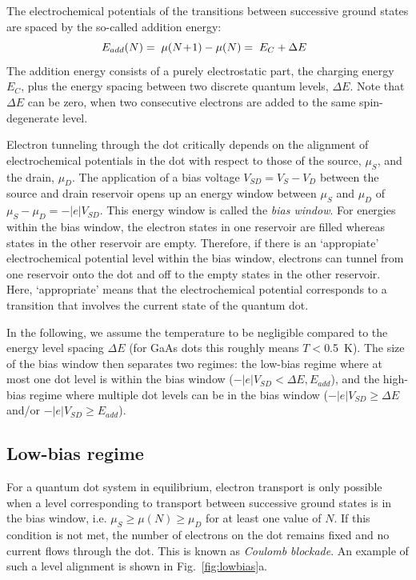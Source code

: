 \documentclass[rmp,twocolumn,aps]{revtex4}
\begin{document}
The electrochemical potentials of the transitions between
successive ground states are spaced by the so-called addition
energy:
\begin{equation}
E_{add}(N) = \hspace{0.1cm} \mu(N\!+\!1) - \mu(N) = \hspace{0.1cm}
E_C + \Delta E \ \ \label{addition}
\end{equation}
\noindent The addition energy consists of a purely electrostatic
part, the charging energy $E_C$, plus the energy spacing between
two discrete quantum levels, $\Delta E$. Note that $\Delta E$ can
be zero, when two consecutive electrons are added to the same
spin-degenerate level.

Electron tunneling through the dot critically depends on the
alignment of electrochemical potentials in the dot with respect to
those of the source, $\mu_S$, and the drain, $\mu_D$. The
application of a bias voltage $V_{SD}=V_{S}-V_{D}$ between the
source and drain reservoir opens up an energy window between
$\mu_S$ and $\mu_D$ of  $\mu_S -\mu_D=-|e|V_{SD}$. This energy
window is called the \textit{bias window}. For energies within the
bias window, the electron states in one reservoir are filled
whereas states in the other reservoir are empty. Therefore, if
there is an `appropiate' electrochemical potential level within the
bias window, electrons can tunnel from one reservoir onto the dot
and off to the empty states in the other reservoir. Here, `appropriate' means that the electrochemical potential corresponds to a transition that involves the current state of the quantum dot.

In the following, we assume the temperature to be negligible
compared to the energy level spacing $\Delta E$ (for GaAs dots
this roughly means $T<$0.5~K). The size of the bias window then
separates two regimes: the low-bias regime where at most one dot
level is within the bias window ($-|e|V_{SD} < \Delta E,
E_{add}$), and the high-bias regime where multiple dot levels can
be in the bias window ($-|e|V_{SD}\ge\Delta E$ and/or
$-|e|V_{SD}\ge E_{add}$).

\subsection{Low-bias regime}
For a quantum dot system in equilibrium, electron transport is
only possible when a level corresponding to transport between
successive ground states is in the bias window, i.e. $\mu_S \geq
\mu(N) \geq \mu_D$ for at least one value of $N$. If this
condition is not met, the number of electrons on the dot remains
fixed and no current flows through the dot. This is known as
\textit{Coulomb blockade}. An example of such a level alignment is
shown in Fig.~\ref{fig:lowbias}a.
\end{document}
